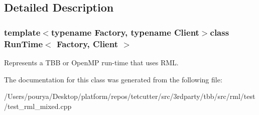 \subsection{Detailed Description}
\subsubsection*{template$<$typename Factory, typename Client$>$class Run\+Time$<$ Factory, Client $>$}

Represents a T\+B\+B or Open\+M\+P run-\/time that uses R\+M\+L. 

The documentation for this class was generated from the following file\+:\begin{DoxyCompactItemize}
\item 
/\+Users/pourya/\+Desktop/platform/repos/tetcutter/src/3rdparty/tbb/src/rml/test/test\+\_\+rml\+\_\+mixed.\+cpp\end{DoxyCompactItemize}
